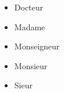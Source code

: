 
\thispagestyle{empty}

\noindent

\begin{itemize}
    \item[Dr.] Docteur
    \item[Mme] Madame
    \item[Mgr] Monseigneur
    \item[M.] Monsieur
    \item[Sr.] Sieur
\end{itemize}
